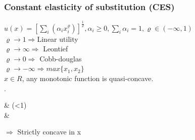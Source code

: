 \documentclass[letterpaper,13pt,single,pdftex]{scrartcl}
\newenvironment{rcases}
  {\left.\begin{aligned}}
  {\end{aligned}\right\rbrace}
\begin{document}
\subsubsection{Constant elasticity of substitution (CES)}
$u(x) = [\sum\limits_{i} (\alpha_i x_i^\varrho)]^{\frac{1}{\varrho}}, \alpha_i \ge 0, \sum\limits_i \alpha_i=1, \varrho\in (-\infty,1)$\\

$\varrho \rightarrow 1 \Rightarrow $Linear utility\\
$\varrho \rightarrow \infty \Rightarrow $ Leontief\\
$\varrho \rightarrow 0 \Rightarrow $ Cobb-douglas\\
$\varrho \rightarrow -\infty \Rightarrow  max\{x_1,x_2\}$\\
$x\in R$, any monotonic function is quasi-concave. \\

\begin{rcases}
     &  (\varrho <1) \\
     & 
\end{rcases}
$\Rightarrow $ Strictly concave in x\\
\end{document}
